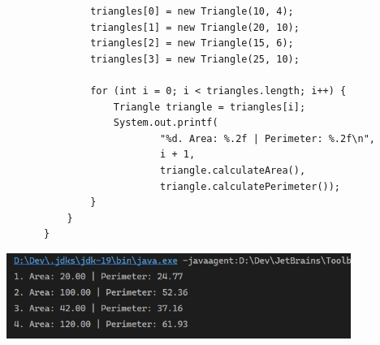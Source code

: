 \documentclass[12pt,titlepage]{article}
\begin{document}
\begin{enumerate}
{\begin{verbatim}
                    triangles[0] = new Triangle(10, 4);
                    triangles[1] = new Triangle(20, 10);
                    triangles[2] = new Triangle(15, 6);
                    triangles[3] = new Triangle(25, 10);

                    for (int i = 0; i < triangles.length; i++) {
                        Triangle triangle = triangles[i];
                        System.out.printf(
                                "%d. Area: %.2f | Perimeter: %.2f\n",
                                i + 1,
                                triangle.calculateArea(),
                                triangle.calculatePerimeter());
                    }
                }
            }
        \end{verbatim}

        \begin{figure}[h]
            \centering
            \includegraphics[width=13cm]{./images/triangles-output.png}
        \end{figure}
    }
\end{enumerate}
\newpage
\end{document}
